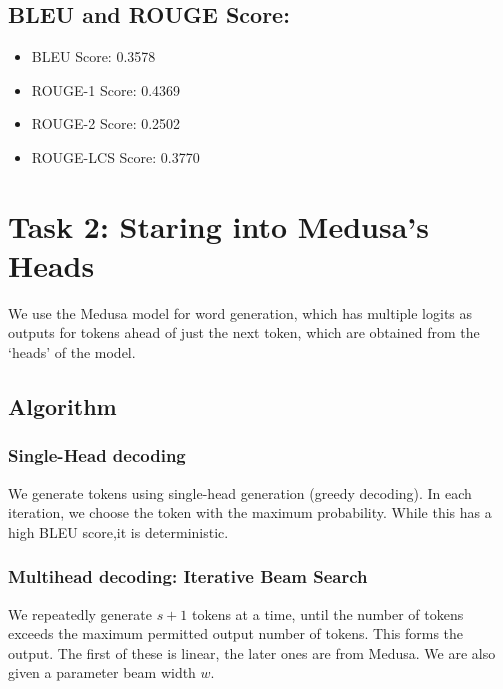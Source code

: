 \documentclass{article}
\begin{document}
\subsection{BLEU and ROUGE Score:}
\begin{itemize}
    \item BLEU Score: 0.3578
    \item ROUGE-1 Score: 0.4369
    \item ROUGE-2 Score: 0.2502
    \item ROUGE-LCS Score: 0.3770
\end{itemize}

\section{Task 2: Staring into Medusa’s Heads}
We use the Medusa model for word generation, which has multiple logits as outputs for tokens ahead of just the next token, which are obtained from the `heads' of the model.

\subsection{Algorithm}
\subsubsection{Single-Head decoding}
We generate  tokens using single-head generation (greedy decoding). In each iteration, we choose the token with the maximum probability. While this has a high BLEU score,it is  deterministic.

\subsubsection{Multihead decoding: Iterative Beam Search}
We repeatedly generate $s + 1$ tokens at a time, until the number of tokens exceeds the maximum permitted output number of tokens. This forms the output. The first of these is linear, the later ones are from Medusa. We are also given a parameter beam width $w$.
\end{document}
